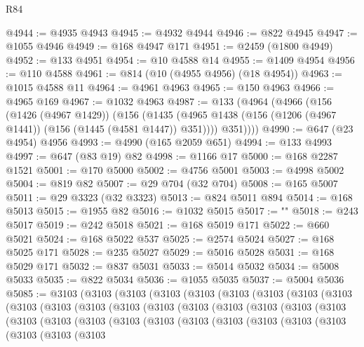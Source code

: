 \begin{lexlean}{R84}
\begin{coremodule}
@4944 := @4935 @4943
@4945 := @4932 @4944
@4946 := @822 @4945
@4947 := @1055 @4946
@4949 := @168 @4947 @171
@4951 := @2459 (@1800 @4949)
@4952 := @133 @4951
@4954 := @10 @4588 @14
@4955 := @1409 @4954
@4956 := @110 @4588
@4961 := @814 (@10 (@4955 @4956) (@18 @4954))
@4963 := @1015 @4588 @11
@4964 := @4961 @4963
@4965 := @150 @4963
@4966 := @4965 @169
@4967 := @1032 @4963
@4987 := @133
    (@4964
      (@4966
        (@156
          (@1426 (@4967 @1429))
          (@156
            (@1435 (@4965 @1438 (@156 (@1206 (@4967 @1441)) (@156 (@1445 (@4581 @1447)) @351))))
            @351))))
@4990 := @647 (@23 @4954) @4956
@4993 := @4990 (@165 @2059 @651)
@4994 := @133 @4993
@4997 := @647 (@83 @19) @82
@4998 := @1166 @17
@5000 := @168 @2287 @1521
@5001 := @170 @5000
@5002 := @4756 @5001
@5003 := @4998 @5002
@5004 := @819 @82
@5007 := @29 @704 (@32 @704)
@5008 := @165 @5007
@5011 := @29 @3323 (@32 @3323)
@5013 := @824 @5011 @894
@5014 := @168 @5013
@5015 := @1955 @82
@5016 := @1032 @5015
@5017 := "\n"
@5018 := @243 @5017
@5019 := @242 @5018
@5021 := @168 @5019 @171
@5022 := @660 @5021
@5024 := @168 @5022 @537
@5025 := @2574 @5024
@5027 := @168 @5025 @171
@5028 := @235 @5027
@5029 := @5016 @5028
@5031 := @168 @5029 @171
@5032 := @837 @5031
@5033 := @5014 @5032
@5034 := @5008 @5033
@5035 := @822 @5034
@5036 := @1055 @5035
@5037 := @5004 @5036
@5085 := @3103
    (@3103
      (@3103
        (@3103
          (@3103
            (@3103
              (@3103
                (@3103
                  (@3103
                    (@3103
                      (@3103
                        (@3103
                          (@3103
                            (@3103
                              (@3103
                                (@3103
                                  (@3103
                                    (@3103
                                      (@3103
                                        (@3103
                                          (@3103
                                            (@3103
                                              (@3103
                                                (@3103
                                                  (@3103
                                                    (@3103
                                                      (@3103
                                                        (@3103
                                                          (@3103
                                                            (@3103
                                                              (@3103
                                                                (@3103

\end{coremodule}
\end{lexlean}
